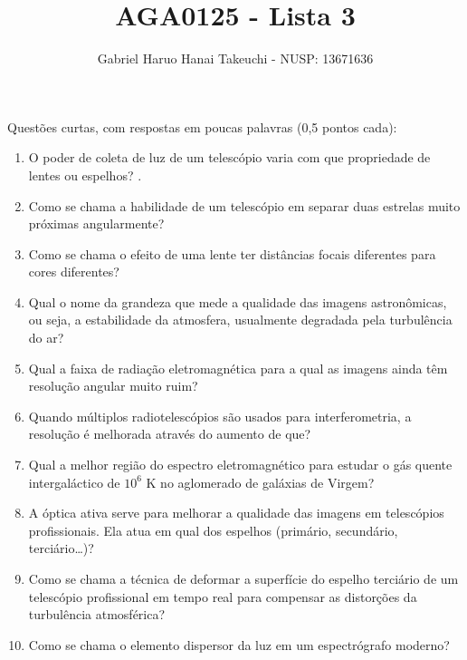 \documentclass{article}
\author{Gabriel Haruo Hanai Takeuchi - NUSP\@: 13671636}
\title{AGA0125 - Lista 3}
\date{}
\begin{document}
\maketitle

Questões curtas, com respostas em poucas palavras (0,5 pontos cada):

\begin{enumerate}
\item O poder de coleta de luz de um telescópio varia com que propriedade de lentes ou espelhos?
.

\item Como se chama a habilidade de um telescópio em separar duas estrelas muito próximas angularmente?

\item Como se chama o efeito de uma lente ter distâncias focais diferentes para cores diferentes?

\item Qual o nome da grandeza que mede a qualidade das imagens astronômicas, ou seja, a estabilidade da atmosfera, usualmente degradada pela turbulência do ar?

\item Qual a faixa de radiação eletromagnética para a qual as imagens ainda têm resolução angular muito ruim?

\item Quando múltiplos radiotelescópios são usados para interferometria, a resolução é melhorada através do aumento de que?

\item Qual a melhor região do espectro eletromagnético para estudar o gás quente intergaláctico de $10^6$ K no aglomerado de galáxias de Virgem?

\item A óptica ativa serve para melhorar a qualidade das imagens em telescópios profissionais. Ela atua em qual dos espelhos (primário, secundário, terciário\ldots)?

\item Como se chama a técnica de deformar a superfície do espelho terciário de um telescópio profissional em tempo real para compensar as distorções da turbulência atmosférica?

\item Como se chama o elemento dispersor da luz em um espectrógrafo moderno?

\end{enumerate}
\end{document}
